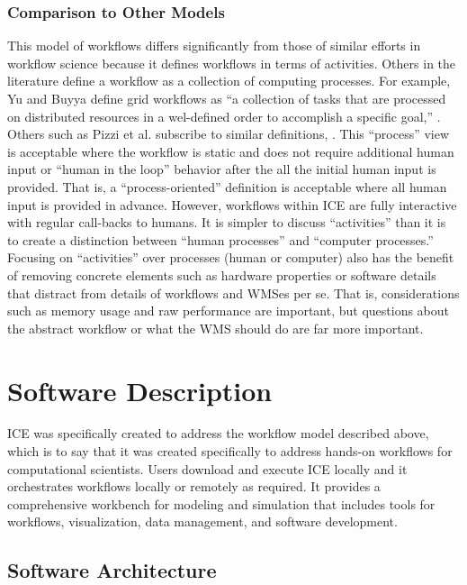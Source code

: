 \subsubsection{Comparison to Other
Models}\label{comparison-to-other-models}

This model of workflows differs significantly from those of similar
efforts in workflow science because it defines workflows in terms of
activities. Others in the literature define a workflow as a collection
of computing processes. For example, Yu and Buyya define grid workflows
as ``a collection of tasks that are processed on distributed resources
in a wel-defined order to accomplish a specific goal,'' \cite{yu_taxonomy_2005}.
Others such as Pizzi et al. subscribe to similar definitions,
\cite{pizzi_aiida:_2016}. This ``process'' view is acceptable where the workflow is static and does not require additional human input or ``human in the
loop'' behavior after the all the initial human input is provided. That
is, a ``process-oriented'' definition is acceptable where all human
input is provided in advance. However, workflows within ICE are fully
interactive with regular call-backs to humans. It is simpler to discuss
``activities'' than it is to create a distinction between ``human
processes'' and ``computer processes.'' Focusing on ``activities'' over
processes (human or computer) also has the benefit of removing concrete
elements such as hardware properties or software details that distract
from details of workflows and WMSes per se. That is, considerations such
as memory usage and raw performance are important, but questions about
the abstract workflow or what the WMS should do are far more important.

\section{Software Description}\label{software-description}

ICE was specifically created to address the workflow model described
above, which is to say that it was created specifically to address
hands-on workflows for computational scientists. Users download and
execute ICE locally and it orchestrates workflows locally or remotely as
required. It provides a comprehensive workbench for modeling and
simulation that includes tools for workflows, visualization, data
management, and software development.

\subsection{Software Architecture}\label{software-architecture}

